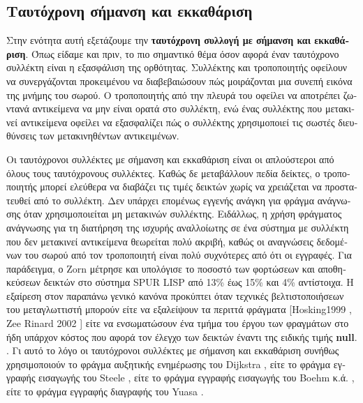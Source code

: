\begin{greek}
\section{Ταυτόχρονη σήμανση και εκκαθάριση}
Στην ενότητα αυτή εξετάζουμε την
\textbf{ταυτόχρονη συλλογή με σήμανση και εκκαθάριση}. Όπως
είδαμε και πριν, το πιο σημαντικό θέμα όσον αφορά έναν
ταυτόχρονο συλλέκτη είναι η εξασφάλιση της ορθότητας.
Συλλέκτης και τροποποιητής οφείλουν να συνεργάζονται
προκειμένου να διαβεβαιώσουν πώς μοιράζονται μια συνεπή
εικόνα της μνήμης του σωρού. Ο τροποποιητής από την πλευρά
του οφείλει να αποτρέπει ζωντανά αντικείμενα να μην είναι
ορατά στο συλλέκτη, ενώ ένας συλλέκτης που μετακινεί
αντικείμενα οφείλει να εξασφαλίζει πώς ο συλλέκτης
χρησιμοποιεί τις σωστές διευθύνσεις των μετακινηθέντων
αντικειμένων.

Οι ταυτόχρονοι συλλέκτες με σήμανση και εκκαθάριση είναι οι
απλούστεροι από όλους τους ταυτόχρονους συλλέκτες. Καθώς δε
μεταβάλλουν πεδία δείκτες, ο τροποποιητής μπορεί ελεύθερα
να διαβάζει τις τιμές δεικτών χωρίς να χρειάζεται να
προστατευθεί από το συλλέκτη. Δεν υπάρχει επομένως εγγενής
ανάγκη για φράγμα ανάγνωσης όταν χρησιμοποιείται μη μετακινών
συλλέκτης. Ειδάλλως, η χρήση φράγματος ανάγνωσης για τη
διατήρηση της ισχυρής αναλλοίωτης σε ένα σύστημα με συλλέκτη
που δεν μετακινεί αντικείμενα θεωρείται πολύ ακριβή, καθώς οι
αναγνώσεις δεδομένων του σωρού από τον τροποποιητή είναι πολύ
συχνότερες από ότι οι εγγραφές. Για παράδειγμα, ο Zorn \cite{DBLP:conf/lfp/Zorn90}
μέτρησε και υπολόγισε το ποσοστό των φορτώσεων και αποθηκεύσεων
δεικτών στο σύστημα SPUR LISP από 13\% έως 15\% και 4\%
αντίστοιχα. Η εξαίρεση στον παραπάνω γενικό κανόνα προκύπτει
όταν τεχνικές βελτιστοποιήσεων του μεταγλωττιστή μπορούν
είτε να εξαλείψουν τα περιττά φράγματα [Hosking1999 \cite{DBLP:conf/oopsla/HoskingC99},
Zee Rinard 2002 \cite{DBLP:conf/oopsla/ZeeR02}]
είτε να ενσωματώσουν ένα τμήμα του έργου των φραγμάτων στο ήδη
υπάρχον κόστος που αφορά τον έλεγχο των δεικτών έναντι της ειδικής τιμής \textbf{null}. 
\cite{DBLP:conf/lctrts/BaconCR03}. Γι αυτό το λόγο οι
ταυτόχρονοι συλλέκτες με σήμανση και εκκαθάριση συνήθως 
χρησιμοποιούν το φράγμα αυξητικής ενημέρωσης του Dijkstra 
\cite{DBLP:conf/ac/DijkstraLMSS75,DBLP:journals/cacm/DijkstraLMSS78},
είτε το φράγμα εγγραφής εισαγωγής του Steele  \cite{DBLP:journals/cacm/Steele75},
είτε το φράγμα εγγραφής εισαγωγής του Boehm κ.ά. \cite{DBLP:conf/pldi/BoehmDS91},
είτε το φράγμα εγγραφής διαγραφής του Yuasa \cite{DBLP:journals/jss/Yuasa90}.


\end{greek}
